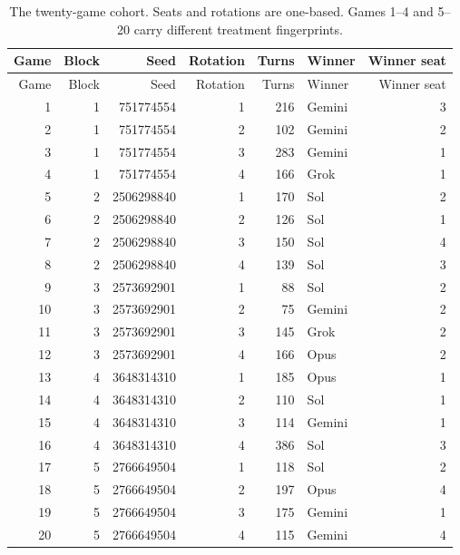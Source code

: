 \begin{longtable}{rrrrrlr}
\caption{The twenty-game cohort. Seats and rotations are one-based. Games 1--4 and 5--20 carry different treatment fingerprints.}\label{tab:cohort}\\
\toprule Game & Block & Seed & Rotation & Turns & Winner & Winner seat\\\midrule\endfirsthead
\toprule Game & Block & Seed & Rotation & Turns & Winner & Winner seat\\\midrule\endhead
1 & 1 & 751774554 & 1 & 216 & Gemini & 3\\
2 & 1 & 751774554 & 2 & 102 & Gemini & 2\\
3 & 1 & 751774554 & 3 & 283 & Gemini & 1\\
4 & 1 & 751774554 & 4 & 166 & Grok & 1\\
5 & 2 & 2506298840 & 1 & 170 & Sol & 2\\
6 & 2 & 2506298840 & 2 & 126 & Sol & 1\\
7 & 2 & 2506298840 & 3 & 150 & Sol & 4\\
8 & 2 & 2506298840 & 4 & 139 & Sol & 3\\
9 & 3 & 2573692901 & 1 & 88 & Sol & 2\\
10 & 3 & 2573692901 & 2 & 75 & Gemini & 2\\
11 & 3 & 2573692901 & 3 & 145 & Grok & 2\\
12 & 3 & 2573692901 & 4 & 166 & Opus & 2\\
13 & 4 & 3648314310 & 1 & 185 & Opus & 1\\
14 & 4 & 3648314310 & 2 & 110 & Sol & 1\\
15 & 4 & 3648314310 & 3 & 114 & Gemini & 1\\
16 & 4 & 3648314310 & 4 & 386 & Sol & 3\\
17 & 5 & 2766649504 & 1 & 118 & Sol & 2\\
18 & 5 & 2766649504 & 2 & 197 & Opus & 4\\
19 & 5 & 2766649504 & 3 & 175 & Gemini & 1\\
20 & 5 & 2766649504 & 4 & 115 & Gemini & 4\\
\bottomrule\end{longtable}
